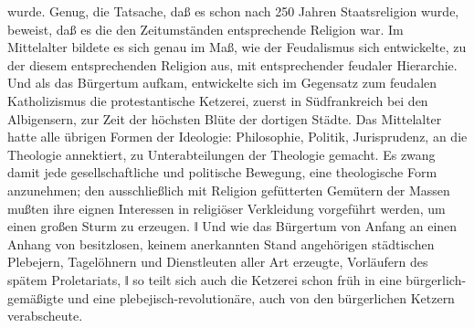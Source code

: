 wurde. Genug, die Tatsache, daß es schon nach 250 Jahren Staatsreligion
wurde, beweist, daß es die den Zeitumständen entsprechende Religion war.
Im Mittelalter bildete es sich genau im Maß, wie der Feudalismus sich
entwickelte, zu der diesem entsprechenden Religion aus, mit
entsprechender feudaler Hierarchie. Und als das Bürgertum aufkam,
entwickelte sich im Gegensatz zum feudalen Katholizismus die
protestantische Ketzerei, zuerst in Südfrankreich bei den Albigensern,
zur Zeit der höchsten Blüte der dortigen Städte. Das Mittelalter hatte
alle übrigen Formen der Ideologie: Philosophie, Politik, Jurisprudenz,
an die Theologie annektiert, zu Unterabteilungen der Theologie gemacht.
Es zwang damit jede gesellschaftliche und politische Bewegung, eine
theologische Form anzunehmen; den ausschließlich mit Religion
gefütterten Gemütern der Massen mußten ihre eignen Interessen in
religiöser Verkleidung vorgeführt werden, um einen großen Sturm zu
erzeugen. ǁ Und wie das Bürgertum von Anfang an einen Anhang von
besitzlosen, keinem anerkannten Stand angehörigen städtischen Plebejern,
Tagelöhnern und Dienstleuten aller Art erzeugte, Vorläufern des spätem
Proletariats, ǁ so teilt sich auch die Ketzerei schon früh in eine
bürgerlich-gemäßigte und eine plebejisch-revolutionäre, auch von den
bürgerlichen Ketzern verabscheute.

